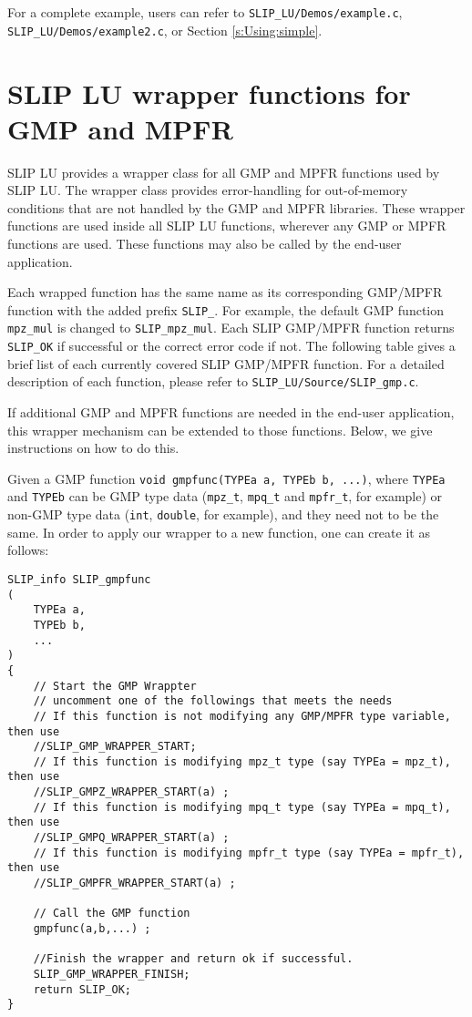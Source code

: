 \documentclass[12pt]{article}
\theoremstyle{definition}
\begin{document}
For a complete example, users can refer to \verb|SLIP_LU/Demos/example.c|,  \\
\verb|SLIP_LU/Demos/example2.c|, or Section \ref{s:Using:simple}.

\section{SLIP LU wrapper functions for GMP and MPFR}

SLIP LU provides a wrapper class for all GMP and MPFR functions used by SLIP
LU.  The wrapper class provides error-handling for out-of-memory conditions
that are not handled by the GMP and MPFR libraries.  These wrapper functions
are used inside all SLIP LU functions, wherever any GMP or MPFR functions are
used.  These functions may also be called by the end-user application.

Each wrapped function has the same name as its corresponding GMP/MPFR function
with the added prefix \verb|SLIP_|. For example, the default GMP function
\verb|mpz_mul| is changed to \verb|SLIP_mpz_mul|. Each SLIP GMP/MPFR function
returns \verb|SLIP_OK| if successful or the correct error code if not. The
following table gives a brief list of each currently covered SLIP GMP/MPFR
function. For a detailed description of each function, please refer to
\verb|SLIP_LU/Source/SLIP_gmp.c|.

If additional GMP and MPFR functions are needed in the end-user application,
this wrapper mechanism can be extended to those functions.  Below, we give
instructions on how to do this.

Given a GMP function \verb|void gmpfunc(TYPEa a, TYPEb b, ...)|, where
\verb|TYPEa| and \verb|TYPEb| can be GMP type data (\verb|mpz_t|,
\verb|mpq_t| and \verb|mpfr_t|, for example) or non-GMP type data (\verb|int|,
\verb|double|, for example), and they need not to be the same. In order to
apply our wrapper to a new function, one can create it as follows:

\begin{mdframed}[userdefinedwidth=6in]
{\footnotesize
\begin{verbatim}
SLIP_info SLIP_gmpfunc
(
    TYPEa a,
    TYPEb b,
    ...
)
{
    // Start the GMP Wrappter
    // uncomment one of the followings that meets the needs
    // If this function is not modifying any GMP/MPFR type variable, then use
    //SLIP_GMP_WRAPPER_START;
    // If this function is modifying mpz_t type (say TYPEa = mpz_t), then use
    //SLIP_GMPZ_WRAPPER_START(a) ;
    // If this function is modifying mpq_t type (say TYPEa = mpq_t), then use
    //SLIP_GMPQ_WRAPPER_START(a) ;
    // If this function is modifying mpfr_t type (say TYPEa = mpfr_t), then use
    //SLIP_GMPFR_WRAPPER_START(a) ;

    // Call the GMP function
    gmpfunc(a,b,...) ;

    //Finish the wrapper and return ok if successful.
    SLIP_GMP_WRAPPER_FINISH;
    return SLIP_OK;
}
\end{verbatim}
} \end{mdframed}
\end{document}
